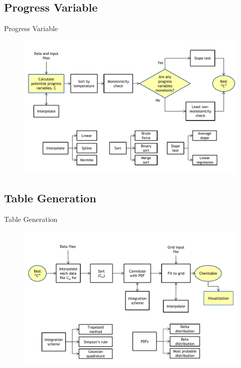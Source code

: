 \documentclass{beamer}
\begin{document}
\subsection{Progress Variable}
\begin{frame}{Progress Variable}
\begin{figure}
\includegraphics[width=\textwidth]{diagram_1_shortened_v1.pdf}
\end{figure}
\end{frame}

\subsection{Table Generation}
\begin{frame}{Table Generation}
\begin{figure}
\includegraphics[width=\textwidth]{diagram_2_shortened_v1.pdf}
\end{figure}
\end{frame}
\end{document}
